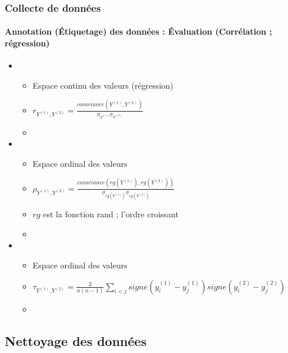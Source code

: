 \documentclass[xcolor=table]{beamer}
\begin{document}
\begin{frame}
	\frametitle{Collecte de données}
	\framesubtitle{Annotation (Étiquetage) des données : Évaluation (Corrélation ; régression)}
	
	\begin{itemize}
		\item {}
		\begin{itemize}
			\item Espace continu des valeurs (régression)
			\item $r_{Y^{(1)},Y^{(2)}} = \frac{covariance(Y^{(1)},Y^{(2)})}{\sigma_{Y^{(1)}} \sigma_{Y^{(2)}}}$
			\item {}
		\end{itemize}
		\item {}
		\begin{itemize}
			\item Espace ordinal des valeurs
			\item $\rho_{Y^{(1)},Y^{(2)}} = \frac{covariance(rg(Y^{(1)}),rg(Y^{(2)}))}{\sigma_{rg(Y^{(1)})} \sigma_{rg(Y^{(2)})}}$
			\item $rg$ est la fonction rand ; l'ordre croissant
			\item {}
		\end{itemize}
		\item {}
		\begin{itemize}
			\item Espace ordinal des valeurs
			\item $\tau_{Y^{(1)},Y^{(2)}} = \frac{2}{n (n-1)} \sum_{i<j} signe(y^{(1)}_i - y^{(1)}_j) signe(y^{(2)}_i - y^{(2)}_j)$
			\item {}
		\end{itemize}
	\end{itemize}
	
\end{frame}

\subsection{Nettoyage des données}
\end{document}
